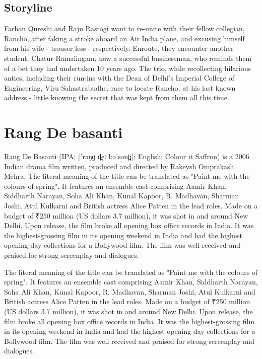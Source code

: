\documentclass{article}
\begin{document}
\subsection{Storyline}
Farhan Qureshi and Raju Rastogi want to re-unite with their fellow collegian, Rancho, after faking a stroke aboard an Air India plane, and excusing himself from his wife - trouser less - respectively. Enroute, they encounter another student, Chatur Ramalingam, now a successful businessman, who reminds them of a bet they had undertaken 10 years ago. The trio, while recollecting hilarious antics, including their run-ins with the Dean of Delhi's Imperial College of Engineering, Viru Sahastrabudhe, race to locate Rancho, at his last known address - little knowing the secret that was kept from them all this time


\section{Rang De basanti}

Rang De Basanti (IPA: [ˈrəŋɡ d̪eː bəˈsənt̪i]; English: Colour it Saffron) is a 2006 Indian drama film written, produced and directed by Rakeysh Omprakash Mehra. The literal meaning of the title can be translated as "Paint me with the colours of spring". It features an ensemble cast comprising Aamir Khan, Siddharth Narayan, Soha Ali Khan, Kunal Kapoor, R. Madhavan, Sharman Joshi, Atul Kulkarni and British actress Alice Patten in the lead roles. Made on a budget of ₹250 million (US dollars 3.7 million), it was shot in and around New Delhi. Upon release, the film broke all opening box office records in India. It was the highest-grossing film in its opening weekend in India and had the highest opening day collections for a Bollywood film. The film was well received and praised for strong screenplay and dialogues.

The literal meaning of the title can be translated as "Paint me with the colours of spring". It features an ensemble cast comprising Aamir Khan, Siddharth Narayan, Soha Ali Khan, Kunal Kapoor, R. Madhavan, Sharman Joshi, Atul Kulkarni and British actress Alice Patten in the lead roles. Made on a budget of ₹250 million (US dollars 3.7 million), it was shot in and around New Delhi. Upon release, the film broke all opening box office records in India. It was the highest-grossing film in its opening weekend in India and had the highest opening day collections for a Bollywood film. The film was well received and praised for strong screenplay and dialogues.
\end{document}
